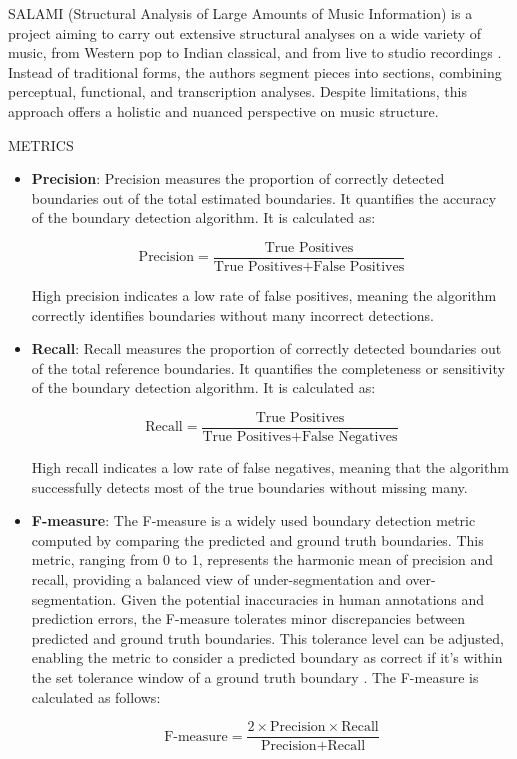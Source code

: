 
SALAMI (Structural Analysis of Large Amounts of Music Information) is a project aiming to carry out extensive structural analyses on a wide variety of music, from Western pop to Indian classical, and from live to studio recordings \cite{Smith2011DESIGNANNOTATIONS}. Instead of traditional forms, the authors segment pieces into sections, combining perceptual, functional, and transcription analyses. Despite limitations, this approach offers a holistic and nuanced perspective on music structure.

METRICS

\begin{itemize}
    \item \textbf{Precision}: Precision measures the proportion of correctly detected boundaries out of the total estimated boundaries. It quantifies the accuracy of the boundary detection algorithm. It is calculated as:
    
    \[
    \text{Precision} = \frac{\text{True Positives}}{\text{True Positives} + \text{False Positives}}
    \]
    
    High precision indicates a low rate of false positives, meaning the algorithm correctly identifies boundaries without many incorrect detections.
    
    \item \textbf{Recall}: Recall measures the proportion of correctly detected boundaries out of the total reference boundaries. It quantifies the completeness or sensitivity of the boundary detection algorithm. It is calculated as:
    
    \[
    \text{Recall} = \frac{\text{True Positives}}{\text{True Positives} + \text{False Negatives}}
    \]
    
    High recall indicates a low rate of false negatives, meaning that the algorithm successfully detects most of the true boundaries without missing many.
    
    \item \textbf{F-measure}: The F-measure is a widely used boundary detection metric computed by comparing the predicted and ground truth boundaries. This metric, ranging from 0 to 1, represents the harmonic mean of precision and recall, providing a balanced view of under-segmentation and over-segmentation. Given the potential inaccuracies in human annotations and prediction errors, the F-measure tolerates minor discrepancies between predicted and ground truth boundaries. This tolerance level can be adjusted, enabling the metric to consider a predicted boundary as correct if it's within the set tolerance window of a ground truth boundary \cite{Turnbull2007ABOOSTING}. The F-measure is calculated as follows:
    
    \[
    \text{F-measure} = \frac{2 \times \text{Precision} \times \text{Recall}}{\text{Precision} + \text{Recall}}
    \]
\end{itemize}

